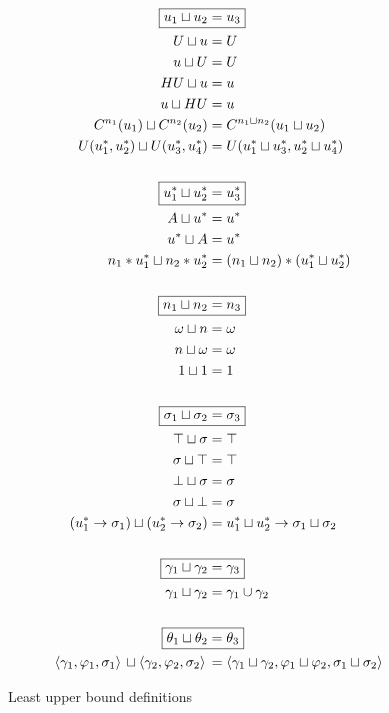 \begin{figure}
\begin{alignat*}{1}
  \Aboxed{u_1 \llub u_2 &= u_3} \\
  U \llub u  &= U \\
  u \llub U  &= U \\
  HU \llub u &= u \\
  u \llub HU &= u \\
  C^{n_1}(u_1) \llub C^{n_2}(u_2) &= C^{n_1 \llub n_2}(u_1 \llub u_2) \\
  U(u^*_1, u^*_2) \llub U(u^*_3, u^*_4) &= U(u^*_1 \llub u^*_3, u^*_2 \llub u^*_4) \\
  &\\
  \Aboxed{u^*_1 \llub u^*_2 &= u^*_3} \\
  A \llub u^* &= u^* \\
  u^* \llub A &= u^* \\ 
  n_1*u^*_1 \llub n_2*u^*_2 &= (n_1 \llub n_2) * (u^*_1 \llub u^*_2) \\
  &\\
  \Aboxed{n_1 \llub n_2 &= n_3} \\
  \omega \llub n &= \omega \\
  n \llub \omega &= \omega \\
  1 \llub 1 &= 1 \\
  &\\
  \Aboxed{\sigma_1 \llub \sigma_2 &= \sigma_3} \\
  \top \llub \sigma &= \top \\
  \sigma \llub \top &= \top \\
  \bot \llub \sigma &= \sigma \\
  \sigma \llub \bot &= \sigma \\
  (u^*_1 \to \sigma_1) \llub (u^*_2 \to \sigma_2) &= u^*_1 \llub u^*_2 \to \sigma_1 \llub \sigma_2 \\
  &\\
  \Aboxed{\gamma_1 \llub \gamma_2 &= \gamma_3} \\
  \gamma_1 \llub \gamma_2 &= \gamma_1 \cup \gamma_2 \\
  &\\
  \Aboxed{\theta_1 \llub \theta_2 &= \theta_3} \\
  \lTriple{\gamma_1}{\varphi_1}{\sigma_1} \llub \lTriple{\gamma_2}{\varphi_2}{\sigma_2} &= \lTriple{\gamma_1 \llub \gamma_2}{\varphi_1 \llub \varphi_2}{\sigma_1 \llub \sigma_2} \\
\end{alignat*}
\label{fig:lub}
\caption{Least upper bound definitions}
\end{figure}

